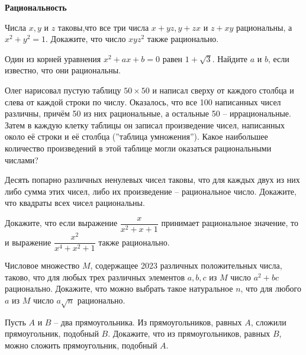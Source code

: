 \documentclass{article}
\begin{document}
    \large

    \begin{center}
        \textbf{Рациональность}
    \end{center}

    \begin{enumerate_boxed}

        \item Числа $x, y$ и $z$ таковы,что все три числа $x+ y z, y+ z x$ и $z+ x y$ рациональны, а $x^2 + y^2 = 1$.
        Докажите, что число  $x y z^2$ также рационально.

        \item Один из корней уравнения  $x^2 + a x + b = 0$ равен $1 + \sqrt{3}$.
        Найдите $a$ и $b$, если известно, что они рациональны.


        \item Олег нарисовал пустую таблицу $50 \times 50$ и написал сверху от каждого столбца и слева от каждой строки по числу.
        Оказалось, что все 100 написанных чисел различны, причём 50 из них рациональные, а остальные 50 – иррациональные.
        Затем в каждую клетку таблицы он записал произведение чисел, написанных около её строки и её столбца (”таблица умножения”).
        Какое наибольшее количество произведений в этой таблице могли оказаться рациональными числами?

        \item Десять попарно различных ненулевых чисел таковы, что для каждых двух из них либо сумма этих чисел, либо их произведение – рациональное число.
        Докажите, что квадраты всех чисел рациональны.

        \item Докажите, что если выражение  $\dfrac{x}{x^2 + x + 1}$ принимает рациональное значение, то и выражение  $\dfrac{x^2}{x^4 + x^2 + 1}$  также рационально.

        \item Числовое множество $M$, содержащее 2023 различных положительных числа, таково, что для любых трех различных элементов  $a,  b, c$ из $M$ число  $a^2 + bc$ рационально.
        Докажите, что можно выбрать такое натуральное $n$, что для любого $a$ из $M$ число  $a\sqrt{n}$ рационально.

        \item Пусть $A$ и $B$ – два прямоугольника.
        Из прямоугольников, равных $A$, сложили прямоугольник, подобный $B$.
        Докажите, что из прямоугольников, равных $B$, можно сложить прямоугольник, подобный $A$.

    \end{enumerate_boxed}
\end{document}
